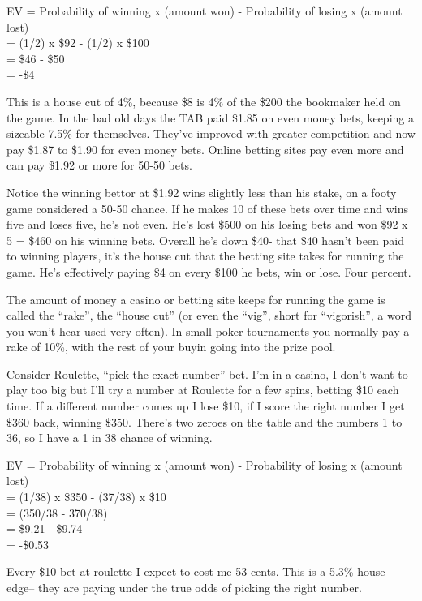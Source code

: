 EV = Probability of winning x (amount won) - Probability of losing x
(amount lost) \\
   = (1/2) x \$92 - (1/2) x \$100 \\
   = \$46 - \$50  \\
   = -\$4

This is a house cut of 4\%, because \$8 is 4\% of the \$200 the bookmaker
held on the game. In the bad old days
the TAB paid \$1.85 on even money bets, keeping a sizeable 7.5\% for
themselves. They've improved with greater competition and now pay \$1.87 to \$1.90 for
even money bets. Online betting sites pay even more and can pay
\$1.92 or more for 50-50 bets.


Notice the winning bettor at \$1.92 wins slightly less than his stake,
on a footy game considered a 50-50 chance. If he makes 10 of these
bets over time and wins five and loses five, he's not even. He's lost
\$500 on his losing bets and won \$92 x 5 = \$460 on his winning bets.
Overall he's down \$40- that \$40 hasn't been paid to winning players,
it's the house cut that the betting site takes for running the game.
He's effectively paying \$4 on every \$100 he bets, win or lose.
Four percent.

The amount of money a casino or betting site keeps for running the
game is called the ``rake'', the ``house cut'' (or even the ``vig'',
short for ``vigorish'', a word you won't hear used very often).
In small poker tournaments you normally pay a rake of 10\%, with the
rest of your buyin going into the prize pool.

Consider Roulette, ``pick the exact number'' bet. I'm in a casino,
I don't want to play too big but I'll try a number at Roulette for a few
spins, betting \$10 each time. If a different number comes up I lose \$10,
if I score the right number I get \$360 back, winning \$350. There's two
zeroes on the table and the numbers 1 to 36, so I have a 1 in 38 chance of
winning.

EV = Probability of winning x (amount won) - Probability of losing x
(amount lost) \\
   = (1/38) x \$350 - (37/38) x \$10 \\
   = (350/38 - 370/38)  \\
   = \$9.21 - \$9.74 \\
   = -\$0.53

Every \$10 bet at roulette I expect to cost me 53 cents. This is a 5.3\% house
edge-- they are paying under the true odds of picking the right
number.


